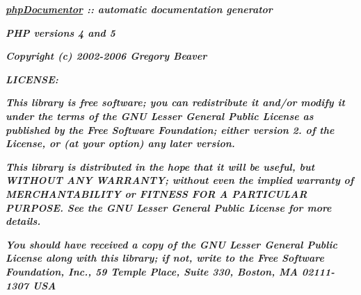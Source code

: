 {\bfseries {\itshape {\ttfamily  \hyperlink{namespacephp_documentor}{php\-Documentor} \-:\-: automatic documentation generator}\/}}

{\bfseries {\itshape {\ttfamily  \-P\-H\-P versions 4 and 5}\/}}

{\bfseries {\itshape {\ttfamily  \-Copyright (c) 2002-\/2006 \-Gregory \-Beaver}\/}}

{\bfseries {\itshape {\ttfamily  \-L\-I\-C\-E\-N\-S\-E\-:}\/}}

{\bfseries {\itshape {\ttfamily  \-This library is free software; you can redistribute it and/or modify it under the terms of the \-G\-N\-U \-Lesser \-General \-Public \-License as published by the \-Free \-Software \-Foundation; either version 2. of the \-License, or (at your option) any later version.}\/}}

{\bfseries {\itshape {\ttfamily  \-This library is distributed in the hope that it will be useful, but \-W\-I\-T\-H\-O\-U\-T \-A\-N\-Y \-W\-A\-R\-R\-A\-N\-T\-Y; without even the implied warranty of \-M\-E\-R\-C\-H\-A\-N\-T\-A\-B\-I\-L\-I\-T\-Y or \-F\-I\-T\-N\-E\-S\-S \-F\-O\-R \-A \-P\-A\-R\-T\-I\-C\-U\-L\-A\-R \-P\-U\-R\-P\-O\-S\-E. \-See the \-G\-N\-U \-Lesser \-General \-Public \-License for more details.}\/}}

{\bfseries {\itshape {\ttfamily  \-You should have received a copy of the \-G\-N\-U \-Lesser \-General \-Public \-License along with this library; if not, write to the \-Free \-Software \-Foundation, \-Inc., 59 \-Temple \-Place, \-Suite 330, \-Boston, \-M\-A 02111-\/1307 \-U\-S\-A}\/}}

